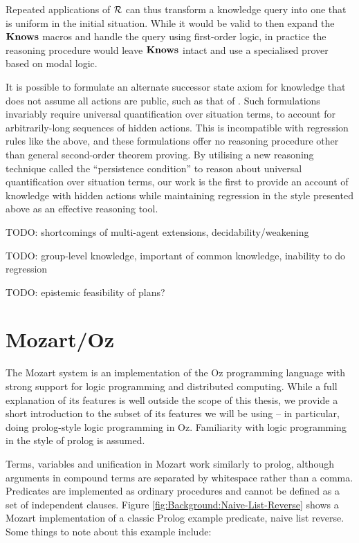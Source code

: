Repeated applications of $\mathcal{R}$ can thus transform a knowledge query
into one that is uniform in the initial situation. While it would
be valid to then expand the $\mathbf{Knows}$ macros and handle the query
using first-order logic, in practice the reasoning procedure would
leave $\mathbf{Knows}$ intact and use a specialised prover based on modal
logic.

It is possible to formulate an alternate successor state axiom for
knowledge that does not assume all actions are public, such as that
of \citet{Lesperance99sitcalc_approach}. Such formulations invariably
require universal quantification over situation terms, to account
for arbitrarily-long sequences of hidden actions. This is incompatible
with regression rules like the above, and these formulations offer
no reasoning procedure other than general second-order theorem proving.
By utilising a new reasoning technique called the {}``persistence
condition'' to reason about universal quantification over situation
terms, our work is the first to provide an account of knowledge with
hidden actions while maintaining regression in the style presented
above as an effective reasoning tool.

TODO: shortcomings of multi-agent extensions, decidability/weakening
\citet{demolombe00tractable_sc_belief} \citet{petrick02knowledge_equivalence}

TODO: group-level knowledge, important of common knowledge, inability
to do regression

TODO: epistemic feasibility of plans? \citet{giacomo04sem_delib_indigolog,Lesperance01epi_feas_casl}


\section{Mozart/Oz\label{sec:Background:Mozart/Oz}}

The Mozart system \citep{vanroy99mozart} is an implementation of
the Oz programming language \citep{vanRoyHaridi04ctm} with strong
support for logic programming and distributed computing. While a full
explanation of its features is well outside the scope of this thesis,
we provide a short introduction to the subset of its features we will
be using -- in particular, doing prolog-style logic programming in
Oz. Familiarity with logic programming in the style of prolog is assumed.

Terms, variables and unification in Mozart work similarly to prolog,
although arguments in compound terms are separated by whitespace rather
than a comma. Predicates are implemented as ordinary procedures and
cannot be defined as a set of independent clauses. Figure \ref{fig:Background:Naive-List-Reverse}
shows a Mozart implementation of a classic Prolog example predicate,
naive list reverse. Some things to note about this example include:

